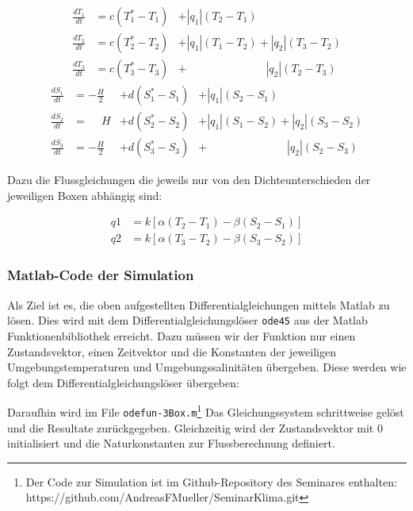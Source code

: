 \begin{equation}
\begin{aligned}
\frac{dT_1}{dt} &= c(T_1^*-T_1)&+|q_1|(T_2-T_1)\phantom{+|q_2|(T_3-T_2)}
\\
\frac{dT_2}{dt} &= c(T_2^*-T_2)&+|q_1|(T_1-T_2)+|q_2|(T_3-T_2)
\\
\frac{dT_3}{dt} &= c(T_3^*-T_3)&+ \phantom{+|q_1|(T_1-T_2)}|q_2|(T_2-T_3)
\end{aligned}
\end{equation}
\begin{equation}
\begin{aligned}
\frac{dS_1}{dt} &= -\frac{H}{2} &+ d(S_1^*-S_1)&+|q_1|(S_2-S_1)\phantom{+|q_2|(S_3-S_2)}
\\
\frac{dS_2}{dt} &= \phantom{-}H &+ d(S_2^*-S_2)&+|q_1|(S_1-S_2)+|q_2|(S_3-S_2)	
\\
\frac{dS_3}{dt} &= -\frac{H}{2} &+d(S_3^*-S_3)&+ \phantom{+|q_1|(S_1-S_2)}|q_2|(S_2-S_3)
\end{aligned}
\end{equation}	

Dazu die Flussgleichungen die jeweils nur von den Dichteunterschieden der jeweiligen Boxen abhängig sind:

\begin{equation}
\begin{aligned}
 q1 &= k[\alpha(T_2-T_1)-\beta(S_2-S_1)] 
 \\
 q2 &= k[\alpha(T_3-T_2)-\beta(S_3-S_2)]
\end{aligned}
\end{equation}

\subsubsection{Matlab-Code der Simulation}

Als Ziel ist es, die oben aufgestellten Differentialgleichungen mittels Matlab zu lösen. Dies wird mit dem Differentialgleichungslöser \texttt{ode45} aus der Matlab Funktionenbibliothek erreicht.
Dazu müssen wir der Funktion nur einen Zustandsvektor, einen Zeitvektor und die Konstanten der jeweiligen Umgebungstemperaturen und Umgebungssalinitäten übergeben.
\label{thermohalin:listing:input}
Diese werden wie folgt dem Differentialgleichungslöser übergeben:
\label{thermohalin:listing:uebergabe}

Daraufhin wird im File \texttt{odefun-3Box.m}\footnote{Der Code zur Simulation ist im Github-Repository des Seminares enthalten: https://github.com/AndreasFMueller/SeminarKlima.git} Das Gleichungssystem schrittweise gelöst und die Resultate zurückgegeben. Gleichzeitig wird der Zustandsvektor mit $0$ initialisiert und die Naturkonstanten zur Flussberechnung definiert.

